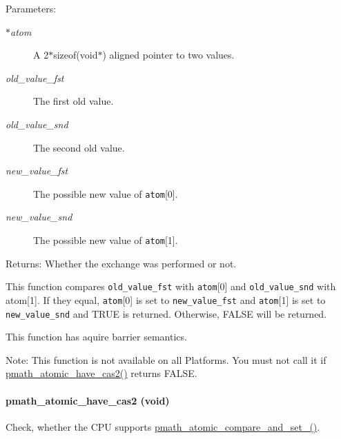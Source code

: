\begin{Desc}
\item[Parameters:]
\begin{description}
\item[{\em $\ast$atom}]A 2$\ast$sizeof(void$\ast$) aligned pointer to two values. \item[{\em old\_\-value\_\-fst}]The first old value. \item[{\em old\_\-value\_\-snd}]The second old value. \item[{\em new\_\-value\_\-fst}]The possible new value of {\tt atom}\mbox{[}0\mbox{]}. \item[{\em new\_\-value\_\-snd}]The possible new value of {\tt atom}\mbox{[}1\mbox{]}. \end{description}
\end{Desc}
\begin{Desc}
\item[Returns:]Whether the exchange was performed or not.\end{Desc}
This function compares {\tt old\_\-value\_\-fst} with {\tt atom}\mbox{[}0\mbox{]} and {\tt old\_\-value\_\-snd} with atom\mbox{[}1\mbox{]}. If they equal, {\tt atom}\mbox{[}0\mbox{]} is set to {\tt new\_\-value\_\-fst} and {\tt atom}\mbox{[}1\mbox{]} is set to {\tt new\_\-value\_\-snd} and TRUE is returned. Otherwise, FALSE will be returned.

This function has aquire barrier semantics.

\begin{Desc}
\item[Note:]This function is not available on all Platforms. You must not call it if \hyperlink{group__atomic__ops_g9bc606e66ad7965f09dc9200f0b21bcc}{pmath\_\-atomic\_\-have\_\-cas2()} returns FALSE. \end{Desc}
\hypertarget{group__atomic__ops_g9bc606e66ad7965f09dc9200f0b21bcc}{
\paragraph[{pmath\_\-atomic\_\-have\_\-cas2}]{ pmath\_\-atomic\_\-have\_\-cas2 (void)}\hfill}
\label{group__atomic__ops_g9bc606e66ad7965f09dc9200f0b21bcc}


Check, whether the CPU supports \hyperlink{group__atomic__ops_g868adc2a74d7aafbb0670922f61a21cc}{pmath\_\-atomic\_\-compare\_\-and\_\-set\_()}. 

